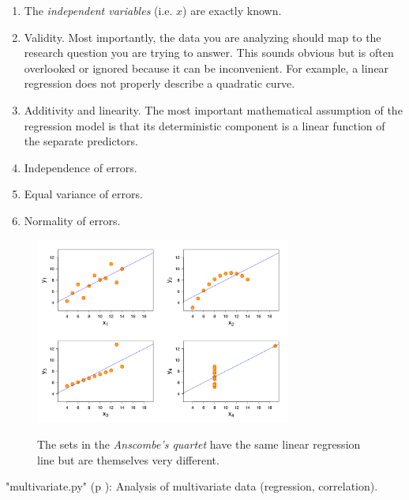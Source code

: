 \begin{enumerate}
  \item The \emph{independent variables} (i.e. $x$) are exactly known.
  \item Validity. Most importantly, the data you are analyzing should map to the research question you are trying to answer. This sounds obvious but is often overlooked or ignored because it can be inconvenient. For example, a linear regression does not properly describe a quadratic curve.
  \item Additivity and linearity. The most important mathematical assumption of the regression model is that its deterministic component is a linear function of the separate predictors.
  \item Independence of errors.
  \item Equal variance of errors.
  \item Normality of errors.
\end{enumerate}

\begin{figure}
  \centering
  \includegraphics[width=0.75\textwidth]{../Images/Anscombes_quartet.png}\\
  \caption{The sets in the \emph{Anscombe's quartet} have the same linear regression line but are themselves very different.}
\end{figure}

\PyImg "multivariate.py" (p \pageref{py:multivariate}): Analysis of multivariate data (regression, correlation).

